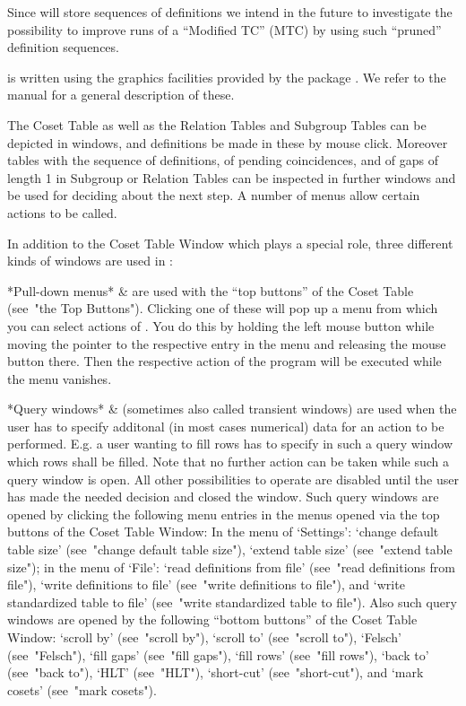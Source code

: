 Since {\ITC} will store sequences of definitions we intend in the
future to investigate the possibility to improve runs of a ``Modified
TC'' (MTC) by using such ``pruned'' definition sequences.



{\ITC} is written using the graphics facilities provided by the
{} package {\XGAP}. We refer to the {\XGAP} manual for a
general description of these.

The {\ITC} Coset Table as well as the Relation Tables and Subgroup
Tables can be depicted in windows, and definitions be made in these by
mouse click. Moreover tables with the sequence of definitions, of
pending coincidences, and of gaps of length 1 in Subgroup or
Relation Tables can be inspected in further windows and be used for
deciding about the next step. A number of menus allow certain
actions to be called.

In addition to the Coset Table Window which plays a special role,
three different kinds of windows are used in {\ITC}:

\beginitems

*Pull-down menus* &
  are used with the ``top buttons'' of the Coset Table (see~"the Top
  Buttons"). Clicking one of these will pop up
  a menu from which you can select actions of {\ITC}. You do this by
  holding the left mouse button while moving the pointer to the
  respective entry in the menu and releasing the mouse button there.
  Then the respective action of the program will be executed while
  the menu vanishes.

*Query windows* &
  (sometimes also called transient windows) are used when the user
  has to specify additonal (in most cases numerical) data for an
  action to be performed. E.g. a user wanting to fill rows has to
  specify in such a query window which rows shall be filled. Note
  that no further action can be taken while such a query window is
  open. All other possibilities to operate {\ITC} are disabled
  until the user has made the needed decision and closed the window.
  Such query windows are opened by clicking the following menu
  entries in the menus opened via the top buttons of the Coset Table
  Window: In the menu of `Settings': `change default table size'
  (see~"change default table size"), `extend table size' (see~"extend
  table size"); in the menu of `File': `read definitions from file'
  (see~"read definitions from file"), `write definitions to file'
  (see~"write definitions to file"), and `write standardized table to
  file' (see~"write standardized table to file"). Also such query
  windows are opened by the following ``bottom buttons'' of the Coset
  Table Window: `scroll by' (see~"scroll by"), `scroll to'
  (see~"scroll to"), `Felsch' (see~"Felsch"), `fill gaps' (see~"fill
  gaps"), `fill rows' (see~"fill rows"), `back to' (see~"back to"),
  `HLT' (see~"HLT"), `short-cut' (see~"short-cut"), and `mark cosets'
  (see~"mark cosets").

